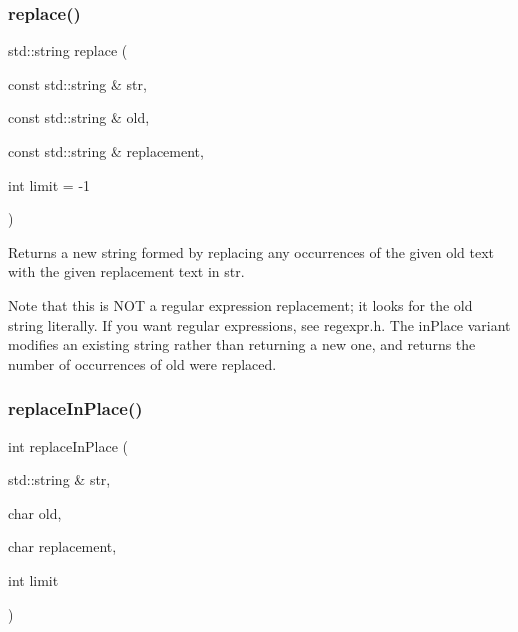 \subsubsection{\texorpdfstring{replace()}{replace()}\hspace{0.1cm}{\footnotesize\ttfamily [2/2]}}
{\footnotesize\ttfamily std\+::string replace (\begin{DoxyParamCaption}\item[{const std\+::string \&}]{str,  }\item[{const std\+::string \&}]{old,  }\item[{const std\+::string \&}]{replacement,  }\item[{int}]{limit = {\ttfamily -\/1} }\end{DoxyParamCaption})}



Returns a new string formed by replacing any occurrences of the given \textquotesingle{}old\textquotesingle{} text with the given replacement text in \textquotesingle{}str\textquotesingle{}. 

Note that this is N\+OT a regular expression replacement; it looks for the \textquotesingle{}old\textquotesingle{} string literally. If you want regular expressions, see regexpr.\+h. The \textquotesingle{}in\+Place\textquotesingle{} variant modifies an existing string rather than returning a new one, and returns the number of occurrences of \textquotesingle{}old\textquotesingle{} were replaced. \mbox{\label{namespacesgl_1_1priv_1_1strlib_a6ef4063d045756e26512bde874824042}} 
\subsubsection{\texorpdfstring{replace\+In\+Place()}{replaceInPlace()}\hspace{0.1cm}{\footnotesize\ttfamily [1/2]}}
{\footnotesize\ttfamily int replace\+In\+Place (\begin{DoxyParamCaption}\item[{std\+::string \&}]{str,  }\item[{char}]{old,  }\item[{char}]{replacement,  }\item[{int}]{limit }\end{DoxyParamCaption})}



